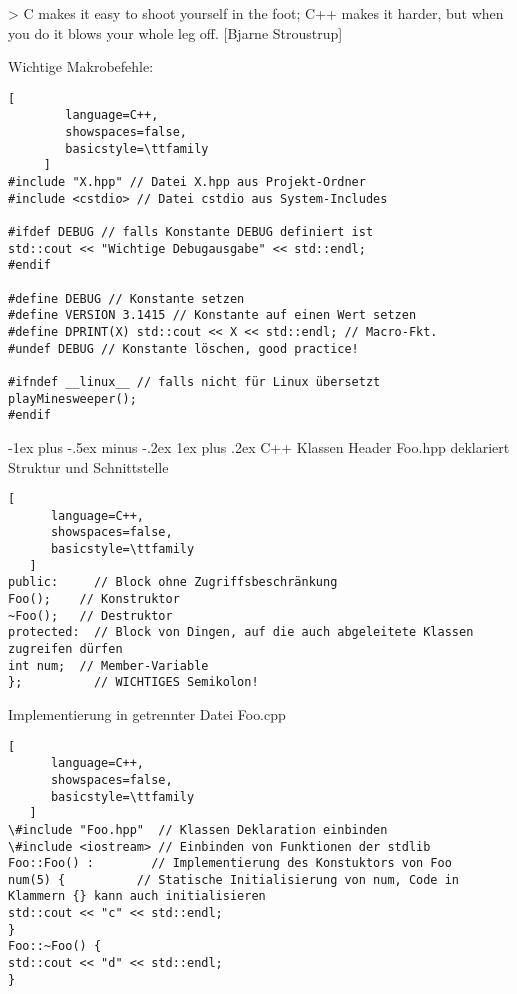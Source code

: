 \documentclass[10pt]{article}
\makeatletter
\renewcommand{\subsubsection}{\@startsection{subsubsection}{3}{0mm}%
                                {-1ex plus -.5ex minus -.2ex}%
                                {1ex plus .2ex}%
                                {\normalfont\small\bfseries}}
\makeatother
\begin{document}
\begin{itemize*}
> C makes it easy to shoot yourself in the foot; C++ makes it harder, but when you do it blows your whole leg off. [Bjarne Stroustrup]


Wichtige Makrobefehle:
\begin{lstlisting}[
        language=C++,
        showspaces=false,
        basicstyle=\ttfamily
     ]
#include "X.hpp" // Datei X.hpp aus Projekt-Ordner
#include <cstdio> // Datei cstdio aus System-Includes

#ifdef DEBUG // falls Konstante DEBUG definiert ist
std::cout << "Wichtige Debugausgabe" << std::endl;
#endif

#define DEBUG // Konstante setzen
#define VERSION 3.1415 // Konstante auf einen Wert setzen
#define DPRINT(X) std::cout << X << std::endl; // Macro-Fkt.
#undef DEBUG // Konstante löschen, good practice!

#ifndef __linux__ // falls nicht für Linux übersetzt
playMinesweeper();
#endif
\end{lstlisting}


\subsubsection{C++ Klassen}
Header Foo.hpp deklariert Struktur und Schnittstelle
\begin{lstlisting}[
      language=C++,
      showspaces=false,
      basicstyle=\ttfamily
   ]
public:     // Block ohne Zugriffsbeschränkung
Foo();    // Konstruktor
~Foo();   // Destruktor
protected:  // Block von Dingen, auf die auch abgeleitete Klassen zugreifen dürfen
int num;  // Member-Variable
};          // WICHTIGES Semikolon!
\end{lstlisting}


Implementierung in getrennter Datei Foo.cpp
\begin{lstlisting}[
      language=C++,
      showspaces=false,
      basicstyle=\ttfamily
   ]
\#include "Foo.hpp"  // Klassen Deklaration einbinden
\#include <iostream> // Einbinden von Funktionen der stdlib
Foo::Foo() :        // Implementierung des Konstuktors von Foo
num(5) {          // Statische Initialisierung von num, Code in Klammern {} kann auch initialisieren
std::cout << "c" << std::endl;
}
Foo::~Foo() {
std::cout << "d" << std::endl;
}
\end{lstlisting}



\end{itemize*}
\end{document}
